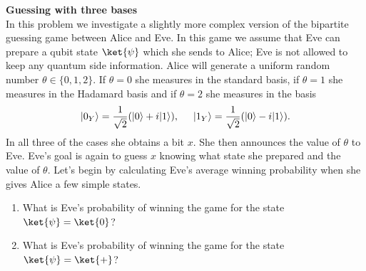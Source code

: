 \begin{exercises}
\item {\bf Guessing with three bases}\\
In this problem we investigate a slightly more complex version of the bipartite guessing game between Alice and Eve. In this game we assume that Eve can prepare a qubit state \(\ket{\psi}\) which she sends to Alice; Eve is not allowed to keep any quantum side information. Alice will  generate a uniform random number \(\theta \in \{0,1,2\}\). If \(\theta=0\) she measures in the standard basis, if \(\theta=1\) she measures in the Hadamard basis and if \(\theta=2\) she measures in the basis
\[ |0_Y\rangle = \frac{1}{\sqrt{2}}(|0\rangle+ i|1\rangle),\hspace{5mm} |1_Y\rangle = \frac{1}{\sqrt{2}}(|0\rangle- i|1\rangle).\]
In all three of the cases she obtains a bit \(x\). She then announces the value of \(\theta\) to Eve. Eve's goal is again to guess \(x\) knowing what state she prepared and the value of \(\theta\).
Let's begin by calculating Eve's average winning probability when she gives Alice a few simple states.
\begin{enumerate}
\item What is Eve's probability of winning the game for the state $\ket{\psi}=\ket{0}$?
\item What is Eve's probability of winning the game for the state $\ket{\psi}=\ket{+}$?

\end{enumerate}
\end{exercises}
